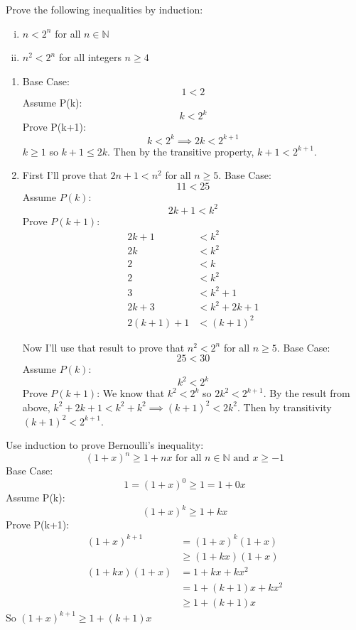 \documentclass[paper=a4, fontsize=11pt]{jhwhw} %
\begin{document}
Prove the following inequalities by induction:
\begin{enumerate}[(i)]
    \item $n < 2^n$ for all $n\in \mathbb N$
    \item $n^2 < 2^n$ for all integers $n\ge 4$ 
\end{enumerate}
\solution
\begin{enumerate}[i]
    \item 
        Base Case:
        $$1 < 2$$
        Assume P(k):
        $$k < 2^k$$
        Prove P(k+1):
        $$k < 2^k \implies 2k < 2^{k+1}$$
        $k\ge 1$ so $k+1 \le 2k$. Then by the transitive property, $k+1 < 2^{k+1}$.
    \item 
        First I'll prove that $2n + 1 < n^2$ for all $n \ge 5$.
        Base Case:
        $$11 < 25$$
        Assume $P(k)$:
        $$2k + 1 < k^2$$
        Prove $P(k+1)$:
        \begin{align*}
            2k + 1 &< k^2\\
            2k &< k^2\\
            2 &< k\\
            2 &< k^2\\
            3 &< k^2 + 1\\
            2k + 3 &< k^2 + 2k + 1\\
            2(k+1) + 1 &< (k+1)^2
        \end{align*}

        Now I'll use that result to prove that $n^2 < 2^n$ for all $n \ge 5$.
        Base Case:
        $$25 < 30$$
        Assume $P(k)$:
        $$k^2 < 2^k$$
        Prove $P(k+1)$:
        We know that $k^2 < 2^k$ so $2k^2 < 2^{k+1}$. By the result from above, $k^2 + 2k + 1 < k^2 + k^2 \implies (k+1)^2 < 2k^2$. Then by transitivity $(k+1)^2 < 2^{k+1}$.

\end{enumerate}


Use induction to prove Bernoulli's inequality:
$$(1 + x)^n \ge 1 + nx\text{ for all }n\in \mathbb N\text{ and } x\ge -1$$
\solution
Base Case:
$$1 = (1+x)^0 \ge 1 = 1 + 0x$$
Assume P(k):
$$(1+x)^k \ge 1 + kx$$
Prove P(k+1):
\begin{align}
    (1 + x)^{k+1} &= (1+x)^k(1+x)\\
                  &\ge (1 + kx)(1+x)\\
    (1 + kx)(1+x) &= 1 + kx + kx^2\\
                  &= 1 + (k+1)x + kx^2\\
                  &\ge 1 + (k+1)x
\end{align}
So $(1+x)^{k+1} \ge 1 + (k + 1)x$
\end{document}
